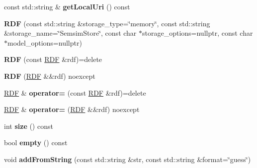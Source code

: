 \begin{DoxyCompactItemize}
\mbox{\label{classomexmeta_1_1RDF_a58b64a5972f74564994028504d8d227c}} 
const std\+::string \& {\bfseries get\+Local\+Uri} () const
\item 
\mbox{\label{classomexmeta_1_1RDF_aecb90e51830082f78ff055c045f4b439}} 
{\bfseries R\+DF} (const std\+::string \&storage\+\_\+type=\char`\"{}memory\char`\"{}, const std\+::string \&storage\+\_\+name=\char`\"{}Semsim\+Store\char`\"{}, const char $\ast$storage\+\_\+options=nullptr, const char $\ast$model\+\_\+options=nullptr)
\item 
\mbox{\label{classomexmeta_1_1RDF_ad95c4a8588988efe399c7f984e304990}} 
{\bfseries R\+DF} (const \hyperlink{classomexmeta_1_1RDF}{R\+DF} \&rdf)=delete
\item 
\mbox{\label{classomexmeta_1_1RDF_a6490b2ea0d10e3026bea587a305b7fb9}} 
{\bfseries R\+DF} (\hyperlink{classomexmeta_1_1RDF}{R\+DF} \&\&rdf) noexcept
\item 
\mbox{\label{classomexmeta_1_1RDF_a9d1b20d798969d3c1dac412c621247b9}} 
\hyperlink{classomexmeta_1_1RDF}{R\+DF} \& {\bfseries operator=} (const \hyperlink{classomexmeta_1_1RDF}{R\+DF} \&rdf)=delete
\item 
\mbox{\label{classomexmeta_1_1RDF_ae3739bda3be0986547c31559381f3df4}} 
\hyperlink{classomexmeta_1_1RDF}{R\+DF} \& {\bfseries operator=} (\hyperlink{classomexmeta_1_1RDF}{R\+DF} \&\&rdf) noexcept
\item 
\mbox{\label{classomexmeta_1_1RDF_a63247bb3a05957abf7320c060543c3ca}} 
int {\bfseries size} () const
\item 
\mbox{\label{classomexmeta_1_1RDF_ab6525e8db606ffd48425b05ad2a204d8}} 
bool {\bfseries empty} () const
\item 
\mbox{\label{classomexmeta_1_1RDF_a9a29912bc44d47d371a2357b75194fc3}} 
void {\bfseries add\+From\+String} (const std\+::string \&str, const std\+::string \&format=\char`\"{}guess\char`\"{})
\item 
\mbox{\label{classomexmeta_1_1RDF_af99201be3782319d32e963ca7bed5b2b}} 

\end{DoxyCompactItemize}
